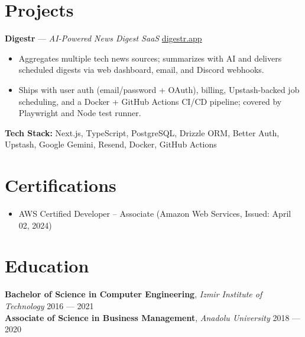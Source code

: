 \documentclass[letterpaper,10pt]{article}
\newcommand{\skills}[1]{\textbf{#1}}
\begin{document}
\section{Projects}

\textbf{Digestr} --- \textit{AI-Powered News Digest SaaS} \hfill \href{https://digestr.app}{digestr.app} \\
\begin{itemize}[leftmargin=1.5em, label=\textbullet, noitemsep, topsep=2pt]
    \item Aggregates multiple tech news sources; summarizes with AI and delivers scheduled digests via web dashboard, email, and Discord webhooks.
    \item Ships with user auth (email/password + OAuth), billing, Upstash-backed job scheduling, and a Docker + GitHub Actions CI/CD pipeline; covered by Playwright and Node test runner.
\end{itemize}
\textbf{Tech Stack:} Next.js, TypeScript, PostgreSQL, Drizzle ORM, Better Auth, Upstash, Google Gemini, Resend, Docker, GitHub Actions

\section{Certifications}

\begin{itemize}[leftmargin=1.5em, label=\textbullet, noitemsep]
  \item AWS Certified Developer – Associate (Amazon Web Services, Issued: April 02, 2024)
\end{itemize}

\section{Education}

\noindent \skills{Bachelor of Science in Computer Engineering}, \textit{Izmir Institute of Technology} \hfill 2016 --- 2021 \\
\skills{Associate of Science in Business Management}, \textit{Anadolu University} \hfill 2018 --- 2020
\end{document}
